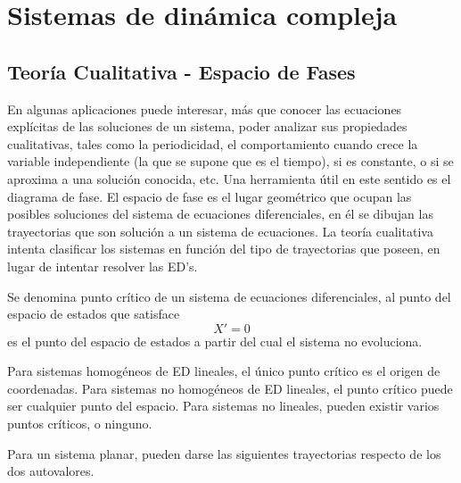 \chapter{Sistemas de dinámica compleja}
\label{capSist}



\section{Teoría Cualitativa - Espacio de Fases}
En algunas aplicaciones puede interesar, más que conocer las ecuaciones explícitas de las soluciones de un sistema, poder analizar sus propiedades cualitativas, tales como la periodicidad, el comportamiento cuando crece la variable independiente (la que se supone que es el tiempo), si es constante, o si se aproxima a una solución conocida, etc.
Una herramienta útil en este sentido es el diagrama de fase.
El espacio de fase es el lugar geométrico que ocupan las posibles soluciones del sistema de ecuaciones diferenciales, en él se dibujan las trayectorias que son solución a un sistema de ecuaciones.
La teoría cualitativa intenta clasificar los sistemas en función del tipo de trayectorias que poseen, en lugar de intentar resolver las ED’s.

Se denomina punto crítico de un sistema de ecuaciones diferenciales, al punto del espacio de estados que satisface 
\begin{equation}
X'=0
\end{equation}
es el punto del espacio de estados a partir del cual el sistema no evoluciona.

Para sistemas homogéneos de ED lineales, el único punto crítico es el origen de coordenadas. Para sistemas no homogéneos de ED lineales, el punto crítico puede ser cualquier punto del espacio. Para sistemas no lineales, pueden existir varios puntos críticos, o ninguno.

Para un sistema planar, pueden darse las siguientes trayectorias respecto de los dos autovalores.

